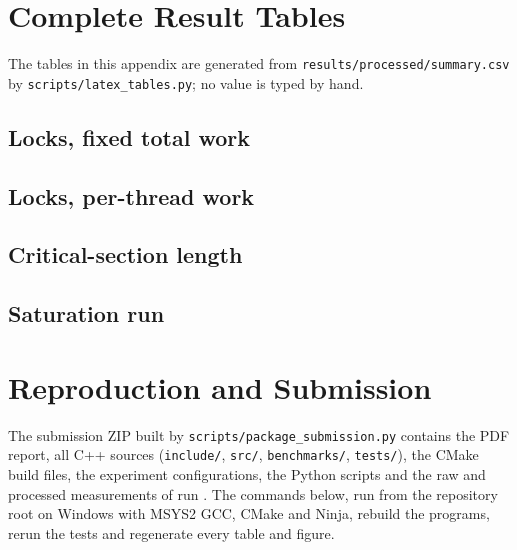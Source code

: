 \newpage
\section{Complete Result Tables}\label{app:tables}

The tables in this appendix are generated from \texttt{results/processed/summary.csv} by \texttt{scripts/latex\_tables.py}; no value is typed by hand.

\subsection{Locks, fixed total work}







\subsection{Locks, per-thread work}






\subsection{Critical-section length}





\subsection{Saturation run}


\newpage
\section{Reproduction and Submission}\label{app:repro}

The submission ZIP built by \texttt{scripts/package\_submission.py} contains the PDF report, all C++ sources (\texttt{include/}, \texttt{src/}, \texttt{benchmarks/}, \texttt{tests/}), the CMake build files, the experiment configurations, the Python scripts and the raw and processed measurements of run \texttt{\RunID}. The commands below, run from the repository root on Windows with MSYS2 GCC, CMake and Ninja, rebuild the programs, rerun the tests and regenerate every table and figure.

